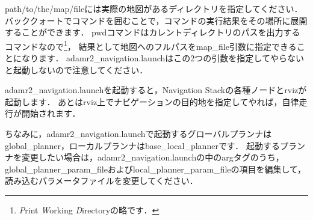 \documentclass[{../../master}]{subfiles}
\begin{document}
\textsf{path/to/the/map/file}には実際の地図があるディレクトリを指定してください．
バッククォートでコマンドを囲むことで，コマンドの実行結果をその場所に展開することができます．
\textsf{pwd}コマンドはカレントディレクトリのパスを出力するコマンドなので\footnote{\emph{P}rint \emph{W}orking \emph{D}irectoryの略です．}，
結果として地図へのフルパスを\textsf{map\_file}引数に指定できることになります．
\textsf{adamr2\_navigation.launch}はこの2つの引数を指定してやらないと起動しないので注意してください．

\textsf{adamr2\_navigation.launch}を起動すると，Navigation Stackの各種ノードと\textsf{rviz}が起動します．
あとは\textsf{rviz}上でナビゲーションの目的地を指定してやれば，自律走行が開始されます．

ちなみに，\textsf{adamr2\_navigation.launch}で起動するグローバルプランナは\textsf{global\_planner}，ローカルプランナは\textsf{base\_local\_planner}です．
起動するプランナを変更したい場合は，\textsf{adamr2\_navigation.launch}の中の\textsf{arg}タグのうち，\textsf{global\_planner\_param\_file}および\textsf{local\_planner\_param\_file}の項目を編集して，読み込むパラメータファイルを変更してください．
\end{document}
